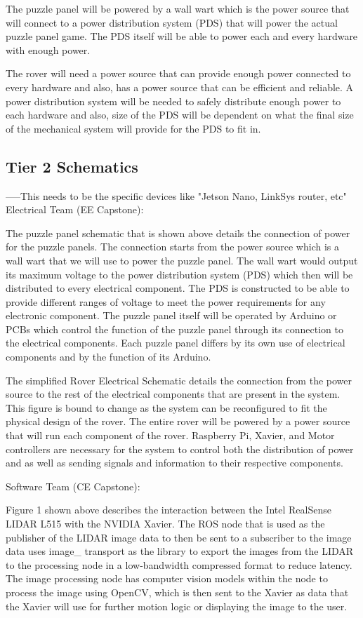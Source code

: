 \documentclass[a4paper, 10pt]{article}
\begin{document}
The puzzle panel will be powered by a wall wart which is the power source that will connect to a power distribution system (PDS) that will power the actual puzzle panel game. The PDS itself will be able to power each and every hardware with enough power.

	The rover will need a power source that can provide enough power connected to every hardware and also, has a power source that can be efficient and reliable. A power distribution system will be needed to safely distribute enough power to each hardware and also, size of the PDS will be dependent on what the final size of the mechanical system will provide for the PDS to fit in.  

	\subsection{Tier 2 Schematics}
	-----This needs to be the specific devices like "Jetson Nano, LinkSys router, etc"
	Electrical Team (EE Capstone):
	
The puzzle panel schematic that is shown above details the connection of power for the puzzle panels. The connection starts from the power source which is a wall wart that we will use to power the puzzle panel. The wall wart would output its maximum voltage to the power distribution system (PDS) which then will be distributed to every electrical component. The PDS is constructed to be able to provide different ranges of voltage to meet the power requirements for any electronic component. The puzzle panel itself will be operated by Arduino or PCBs which control the function of the puzzle panel through its connection to the electrical components. Each puzzle panel differs by its own use of electrical components and by the function of its Arduino. 
	
	The simplified Rover Electrical Schematic details the connection from the power source to the rest of the electrical components that are present in the system. This figure is bound to change as the system can be reconfigured to fit the physical design of the rover. The entire rover will be powered by a power source that will run each component of the rover. Raspberry Pi, Xavier, and Motor controllers are necessary for the system to control both the distribution of power and as well as sending signals and information to their respective components.  

	
Software Team (CE Capstone):

Figure 1 shown above describes the interaction between the Intel RealSense LIDAR L515 with the NVIDIA Xavier. The ROS node that is used as the publisher of the LIDAR image data to then be sent to a subscriber to the image data uses image\_ transport as the library to export the images from the LIDAR to the processing node in a low-bandwidth compressed format to reduce latency. The image processing node has computer vision models within the node to process the image using OpenCV, which is then sent to the Xavier as data that the Xavier will use for further motion logic or displaying the image to the user.
\end{document}
